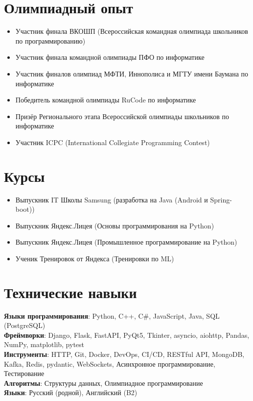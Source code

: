 \documentclass[letterpaper,11pt]{article}
\newcommand{\resumeItem}[1]{
  \item\small{
    {#1 \vspace{-2pt}}
  }
}
\newcommand{\resumeSubHeadingListStart}{\begin{itemize}[leftmargin=0.15in, label={}]}
\newcommand{\resumeSubHeadingListEnd}{\end{itemize}}
\begin{document}
\section{Олимпиадный опыт}
  \resumeSubHeadingListStart
    \resumeItem{Участник финала ВКОШП (Всероссийская командная олимпиада школьников по программированию)}
    \resumeItem{Участник финала командной олимпиады ПФО по информатике}
    \resumeItem{Участник финалов олимпиад МФТИ, Иннополиса и МГТУ имени Баумана по информатике}
    \resumeItem{Победитель командной олимпиады RuCode по информатике}
    \resumeItem{Призёр Регионального этапа Всероссийской олимпиады школьников по информатике}
    \resumeItem{Участник ICPC (International Collegiate Programming Contest)}
  \resumeSubHeadingListEnd

\section{Курсы}
  \resumeSubHeadingListStart
    \resumeItem{Выпускник IT Школы Samsung (разработка на Java (Android и Spring-boot))}
    \resumeItem{Выпускник Яндекс.Лицея (Основы программирования на Python)}
    \resumeItem{Выпускник Яндекс.Лицея (Промышленное программирование на Python)}
    \resumeItem{Ученик Тренировок от Яндекса (Тренировки по ML)}
  \resumeSubHeadingListEnd

\section{Технические навыки}
 \begin{itemize}[leftmargin=0.15in, label={}]
    \small{\item{
     \textbf{Языки программирования}{: Python, C++, C\#, JavaScript, Java, SQL (PostgreSQL)} \\
     \textbf{Фреймворки}{: Django, Flask, FastAPI, PyQt5, Tkinter, asyncio, aiohttp, Pandas, NumPy, matplotlib, pytest} \\
     \textbf{Инструменты}{: HTTP, Git, Docker, DevOps, CI/CD, RESTful API, MongoDB, Kafka, Redis, pydantic, WebSockets, Асинхронное программирование, Тестирование} \\
     \textbf{Алгоритмы}{: Структуры данных, Олимпиадное программирование} \\
     \textbf{Языки}{: Русский (родной), Английский (B2)}
    }}
 \end{itemize}
\end{document}

